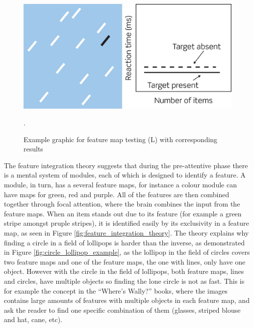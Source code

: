 \begin{figure}[h!]
	\centering
	\includegraphics[width=\textwidth]{figures/Visual_search_paradigm_I.jpg}
	\caption{Example graphic for feature map testing (L) with corresponding results \cite{snowden2012basic}}.\label{fig:visual_search_paradign_i}
\end{figure}

The feature integration theory suggests that during the pre-attentive phase there is a mental system of modules, each of which is designed to identify a feature. A module, in turn, has a several feature maps, for instance a colour module can have maps for green, red and purple. All of the features are then combined together through focal attention, where the brain combines the input from the feature maps. When an item stands out due to its feature (for example a green stripe amongst pruple stripes), it is identified easily by its exclusivity in a feature map, as seen in Figure \ref{fig:feature_integration_theory}. The theory explains why finding a circle in a field of lollipops is harder than the inverse, as demonstrated in Figure \ref{fig:circle_lollipop_example}, as the lollipop in the field of circles covers two feature maps and one of the feature maps, the one with lines, only have one object. However with the circle in the field of lollipops, both feature maps, lines and circles, have multiple objects so finding the lone circle is not as fast. This is for example the concept in the “Where’s Wally?” books, where the images contains large amounts of features with multiple objects in each feature map, and ask the reader to find one specific combination of them (glasses, striped blouse and hat, cane, etc)\cite{snowden2012basic}.

